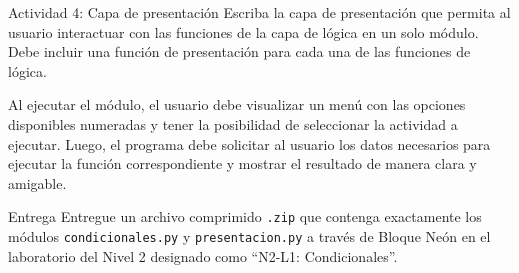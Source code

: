 \documentclass{ip-lab}
\begin{document}
\begin{sectionbox}{Actividad 4: Capa de presentación}
  Escriba la capa de presentación que permita al usuario interactuar con las funciones de la capa de lógica en un solo módulo. Debe incluir una función de presentación para cada una de las funciones de lógica. 
  
  Al ejecutar el módulo, el usuario debe visualizar un menú con las opciones disponibles numeradas y tener la posibilidad de seleccionar la actividad a ejecutar. Luego, el programa debe solicitar al usuario los datos necesarios para ejecutar la función correspondiente y mostrar el resultado de manera clara y amigable.
\end{sectionbox}


\begin{sectionbox}{Entrega}
  Entregue un archivo comprimido \texttt{.zip} que contenga exactamente los módulos \texttt{condicionales.py} y \texttt{presentacion.py} a través de Bloque Neón en el laboratorio del Nivel 2 designado como ``N2-L1: Condicionales''.
\end{sectionbox}
\end{document}
